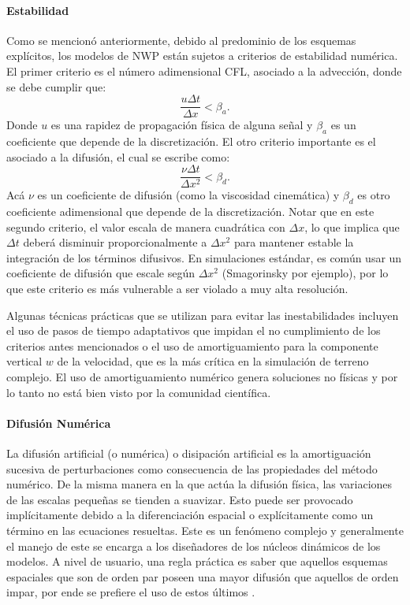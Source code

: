 \paragraph{Estabilidad} Como se mencionó anteriormente, debido al predominio de los esquemas explícitos, los modelos de NWP están sujetos a criterios de estabilidad numérica. El primer criterio es el número adimensional CFL, asociado a la advección, donde se debe cumplir que:
\begin{equation}\label{eq:cfl}
\frac{u\Delta t}{\Delta x}<\beta_a.
\end{equation}
Donde $u$ es una rapidez de propagación física de alguna señal y $\beta_a$ es un coeficiente que depende de la discretización. El otro criterio importante es el asociado a la difusión, el cual se escribe como:
\begin{equation}\label{eq:cfl_d}
\frac{\nu\Delta t}{\Delta x^2}<\beta_d.
\end{equation}
Acá $\nu$ es un coeficiente de difusión (como la viscosidad cinemática) y $\beta_d$ es otro coeficiente adimensional que depende de la discretización. Notar que en este segundo criterio, el valor escala de manera cuadrática con $\Delta x$, lo que implica que $\Delta t$ deberá disminuir proporcionalmente a $\Delta x^2$ para mantener estable la integración de los términos difusivos. En simulaciones estándar, es común usar un coeficiente de difusión que escale según $\Delta x^2$ (Smagorinsky por ejemplo), por lo que este criterio es más vulnerable a ser violado a muy alta resolución.

Algunas técnicas prácticas que se utilizan para evitar las inestabilidades incluyen el uso de pasos de tiempo adaptativos que impidan el no cumplimiento de los criterios antes mencionados o el uso de amortiguamiento para la componente vertical $w$ de la velocidad, que es la más crítica en la simulación de terreno complejo. El uso de amortiguamiento numérico genera soluciones no físicas y por lo tanto no está bien visto por la comunidad científica.

\paragraph{Difusión Numérica} La difusión artificial (o numérica) o disipación artificial es la amortiguación sucesiva de perturbaciones como consecuencia de las propiedades del método numérico. De la misma manera en la que actúa la difusión física, las variaciones de las escalas pequeñas se tienden a suavizar. Esto puede ser provocado implícitamente debido a la diferenciación espacial o explícitamente como un término en las ecuaciones resueltas. Este es un fenómeno complejo y generalmente el manejo de este se encarga a los diseñadores de los núcleos dinámicos de los modelos. A nivel de usuario, una regla práctica es saber que aquellos esquemas espaciales que son de orden par poseen una mayor difusión que aquellos de orden impar, por ende se prefiere el uso de estos últimos \citep{arnold2012high}.

